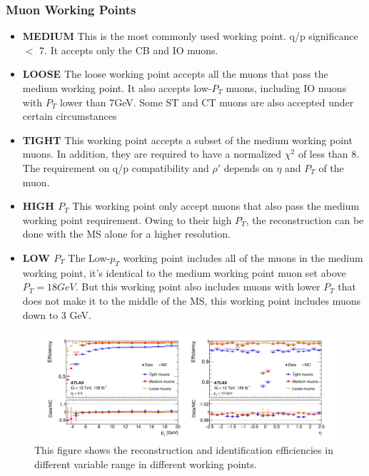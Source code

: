 \subsubsection*{Muon Working Points}
\begin{itemize}

\item \textbf{MEDIUM} \newline
This is the most commonly used working point. q/p significance $<$ 7. It accepts only the CB and IO muons.  

\item \textbf{LOOSE} \newline
    The loose working point accepts all the muons that pass the medium working point. It also accepts low-$P_{T}$ muons, including IO muons with $P_{T}$ lower than 7GeV. Some ST and CT muons are also accepted under certain circumstances~\cite{muonReco2016}

\item \textbf{TIGHT} \newline
    This working point accepts a subset of the medium working point muons. In addition, they are required to have a normalized $\chi^{2}$ of less than 8. The requirement on q/p compatibility and $\rho'$ depends on $\eta$ and $P_{T}$ of the muon.

\item \textbf{HIGH $P_{T}$} \newline
This working point only accept muons that also pass the medium working point requirement. Owing to their high $P_{T}$, the reconstruction can be done with the MS alone for a higher resolution.

\item \textbf{LOW $P_{T}$} \newline
The Low-$p_{T}$ working point includes all of the muons in the medium working point, it's identical to the medium working point muon set above $P_{T}=18GeV$. But this working point also includes muons with lower $P_{T}$ that does not make it to the middle of the MS, this working point includes muons down to 3 GeV. 

\end{itemize}

\begin{figure}[!htb]
    \begin{center}
        \includegraphics[width=1\textwidth]{figures/common_ana/IdentificationEff}
        \caption{
            This figure shows the reconstruction and identification efficiencies in different variable range in different working points\cite{Aad:2746302}.
        }
        \label{fig:isolationWP}
    \end{center}
\end{figure}




